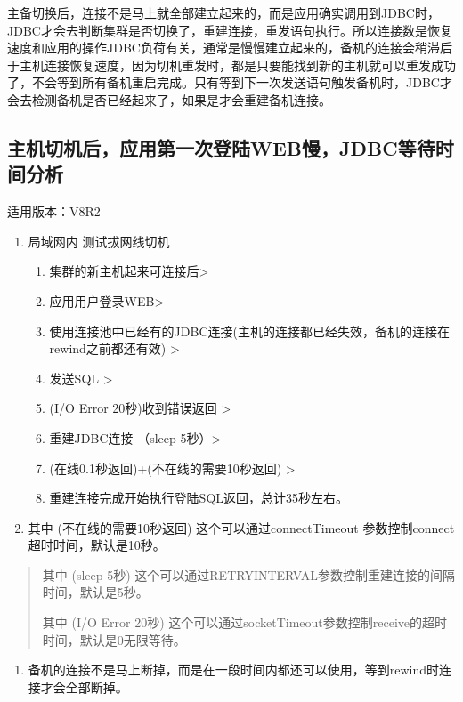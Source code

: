 \documentclass[a4,10pt,oneside,english]{sphinxmanual}
\begin{document}
主备切换后，连接不是马上就全部建立起来的，而是应用确实调用到JDBC时，JDBC才会去判断集群是否切换了，重建连接，重发语句执行。所以连接数是恢复速度和应用的操作JDBC负荷有关，通常是慢慢建立起来的，备机的连接会稍滞后于主机连接恢复速度，因为切机重发时，都是只要能找到新的主机就可以重发成功了，不会等到所有备机重启完成。只有等到下一次发送语句触发备机时，JDBC才会去检测备机是否已经起来了，如果是才会重建备机连接。


\subsection{主机切机后，应用第一次登陆WEB慢，JDBC等待时间分析}
\label{\detokenize{interface/jdbc:web-jdbc}}
适用版本：V8R2
\begin{enumerate}
%
\item {} 
局域网内 测试拔网线切机
\begin{enumerate}
%
\item {} 
集群的新主机起来可连接后\sphinxhyphen{}>

\item {} 
应用用户登录WEB\sphinxhyphen{}>

\item {} 
使用连接池中已经有的JDBC连接(主机的连接都已经失效，备机的连接在rewind之前都还有效) \sphinxhyphen{}>

\item {} 
发送SQL \sphinxhyphen{}>

\item {} 
(I/O Error 20秒)收到错误返回 \sphinxhyphen{}>

\item {} 
重建JDBC连接 （sleep 5秒）\sphinxhyphen{}>

\item {} 
(在线0.1秒返回)+(不在线的需要10秒返回) \sphinxhyphen{}>

\item {} 
重建连接完成开始执行登陆SQL返回，总计35秒左右。

\end{enumerate}

\item {} 
其中 (不在线的需要10秒返回) 这个可以通过connectTimeout 参数控制connect超时时间，默认是10秒。

\end{enumerate}
\begin{quote}

其中 (sleep 5秒) 这个可以通过RETRYINTERVAL参数控制重建连接的间隔时间，默认是5秒。

其中 (I/O Error 20秒) 这个可以通过socketTimeout参数控制receive的超时时间，默认是0无限等待。
\end{quote}
\begin{enumerate}
%
\setcounter{enumi}{2}
\item {} 
备机的连接不是马上断掉，而是在一段时间内都还可以使用，等到rewind时连接才会全部断掉。

\end{enumerate}
\end{document}
